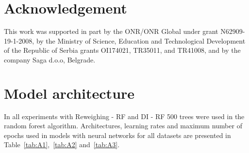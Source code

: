 \documentclass[preprint,12pt]{elsarticle}
\begin{document}
\section*{Acknowledgement}
This work was supported in part by the ONR/ONR Global under grant N62909-19-1-2008, by the Ministry of Science, Education and Technological Development of the Republic of Serbia grants OI174021, TR35011, and TR41008, and by the company Saga d.o.o, Belgrade.




\appendix

\section{Model architecture}
\label{app:Architecture}

In all experiments with Reweighing - RF and DI - RF 500 trees were used in the random forest algorithm. Architectures, learning rates and maximum number of epochs used in models with neural networks for all datasets are presented in Table~\ref{tab:A1},~\ref{tab:A2} and~\ref{tab:A3}.
\end{document}
